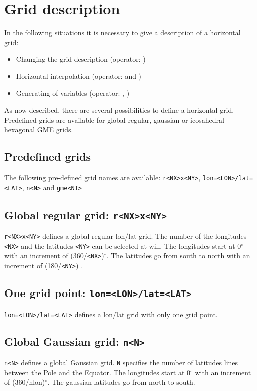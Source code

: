 \section{Grid description}
\label{GRID_DESCRIPTION}

In the following situations it is necessary to give a description of a horizontal grid:

\begin{itemize}
\item Changing the grid description (operator: )
\item Horizontal interpolation (operator:  and )
\item Generating of variables (operator: , )
\end{itemize}

As now described, there are several possibilities to define a horizontal grid.
Predefined grids are available for global regular, gaussian or icosahedral-hexagonal GME grids.


\subsection{Predefined grids}

The following pre-defined grid names are available: 
{\tt r<NX>x<NY>}, {\tt lon=<LON>/lat=<LAT>}, {\tt n<N>} and {\tt gme<NI>}

\subsection*{Global regular grid: {\tt r<NX>x<NY>}}
    {\tt r<NX>x<NY>} defines a global regular lon/lat grid.
    The number of the longitudes {\tt <NX>} and the latitudes {\tt <NY>}
    can be selected at will.
    The longitudes start at 0$^\circ$ with an increment of (360/{\tt <NX>})$^\circ$.
    The latitudes go from south to north with an increment of (180/{\tt <NY>})$^\circ$.

\subsection*{One grid point: {\tt lon=<LON>/lat=<LAT>}}
    {\tt lon=<LON>/lat=<LAT>} defines a lon/lat grid with only one grid point.

\subsection*{Global Gaussian grid: {\tt n<N>}}
    {\tt n<N>} defines a global Gaussian grid. {\tt N} specifies the number of
    latitudes lines between the Pole and the Equator.
    The longitudes start at 0$^\circ$ with an increment of (360/nlon)$^\circ$.
    The gaussian latitudes go from north to south.

